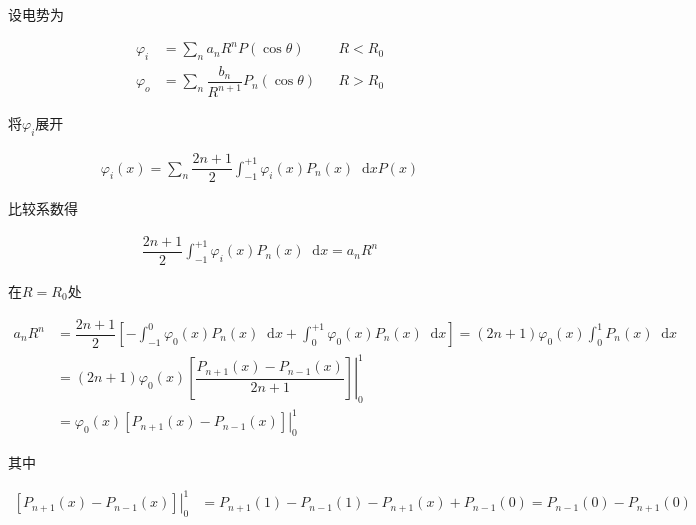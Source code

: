 \documentclass{article}
\newcommand*{\md}{\mathop{}\!\mathrm{d}}
\begin{document}
设电势为

\begin{equation*}
  \begin{aligned}
    \varphi_i &= \sum_n a_n R^n P \left( \cos \theta \right) && R<R_0 \\
    \varphi_o &= \sum_n \dfrac{b_n}{R^{n+1}} P_n \left( \cos \theta \right) && R>R_0 
  \end{aligned}
\end{equation*}

将$\varphi_i$展开

\begin{equation*}
  \begin{aligned}
    \varphi_i \left( x \right) = \sum_n \dfrac{2n+1}{2} \int_{-1}^{+1} \varphi_i \left( x \right) P_n \left( x \right) \md x P \left( x \right) 
  \end{aligned}
\end{equation*}

比较系数得

\begin{equation*}
  \begin{aligned}
    \dfrac{2n+1}{2} \int_{-1}^{+1} \varphi_i \left( x \right) P_n \left( x \right) \md x
    = a_n R^n
  \end{aligned}
\end{equation*}

在$R=R_0$处

\begin{equation*}
  \begin{aligned}
    a_n R^n &=
    \dfrac{2n+1}{2} \left[ - \int_{-1}^{0} \varphi_0 \left( x \right) P_n \left( x \right) \md x + \int_{0}^{+1} \varphi_0 \left( x \right) P_n \left( x \right) \md x \right]
    = \left( 2n+1 \right) \varphi_0 \left( x \right) \int_0^1 P_n \left( x \right) \md x \\
    &= \left( 2n+1 \right) \varphi_0 \left( x \right) \left. \left[ \dfrac{P_{n+1} \left( x \right) - P_{n-1} \left( x \right)}{2n+1} \right] \right|_0^1 \\
    &= \varphi_0 \left( x \right) \left. \left[  P_{n+1} \left( x \right) - P_{n-1} \left( x \right) \right] \right|_0^1
  \end{aligned}
\end{equation*}

其中

\begin{equation*}
  \begin{aligned}
    \left. \left[  P_{n+1} \left( x \right) - P_{n-1} \left( x \right) \right] \right|_0^1
    &= P_{n+1} \left( 1 \right) - P_{n-1} \left( 1 \right) - P_{n+1} \left( x \right) + P_{n-1} \left( 0 \right) = P_{n-1} \left( 0 \right) - P_{n+1} \left( 0 \right) 
  \end{aligned}
\end{equation*}
\end{document}
